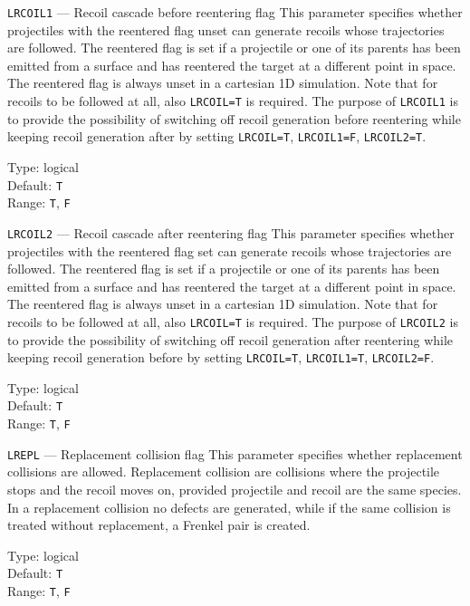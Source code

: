 \begin{keydescription}{\texttt{LRCOIL1} --- Recoil cascade before reentering
flag}
%
  This parameter specifies whether projectiles with the reentered flag unset can
  generate recoils whose trajectories are followed. The reentered flag is
  set if a projectile or one of its parents has been emitted from a surface
  and has reentered the target at a different point in space. The reentered flag
  is always unset in a cartesian 1D simulation. Note that for recoils to be
  followed at all, also \texttt{LRCOIL=T} is required. The purpose of
  \texttt{LRCOIL1} is to provide the possibility of switching off recoil
  generation before reentering while keeping recoil generation after by setting
  \texttt{LRCOIL=T}, \texttt{LRCOIL1=F}, \texttt{LRCOIL2=T}.
  \begin{keytab}
    Type:    \> logical \\
    Default: \> \texttt{T} \\
    Range:   \> \texttt{T}, \texttt{F}
  \end{keytab}
\end{keydescription}

\begin{keydescription}{\texttt{LRCOIL2} --- Recoil cascade after reentering
flag}
%
  This parameter specifies whether projectiles with the reentered flag set can
  generate recoils whose trajectories are followed. The reentered flag is
  set if a projectile or one of its parents has been emitted from a surface
  and has reentered the target at a different point in space. The reentered flag
  is always unset in a cartesian 1D simulation. Note that for recoils to be
  followed at all, also \texttt{LRCOIL=T} is required. The purpose of
  \texttt{LRCOIL2} is to provide the possibility of switching off recoil
  generation after reentering while keeping recoil generation before by
  setting \texttt{LRCOIL=T}, \texttt{LRCOIL1=T}, \texttt{LRCOIL2=F}.
  \begin{keytab}
    Type:    \> logical \\
    Default: \> \texttt{T} \\
    Range:   \> \texttt{T}, \texttt{F}
  \end{keytab}
\end{keydescription}

\begin{keydescription}{\texttt{LREPL} --- Replacement collision flag}
%
  This parameter specifies whether replacement collisions are allowed.
  Replacement collision are collisions where the projectile stops and the 
  recoil moves on, provided projectile and recoil are the same species. In
  a replacement collision no defects are generated, while if the same collision
  is treated without replacement, a Frenkel pair is created.
  \begin{keytab}
    Type:    \> logical \\
    Default: \> \texttt{T} \\
    Range:   \> \texttt{T}, \texttt{F}
  \end{keytab}
\end{keydescription}

